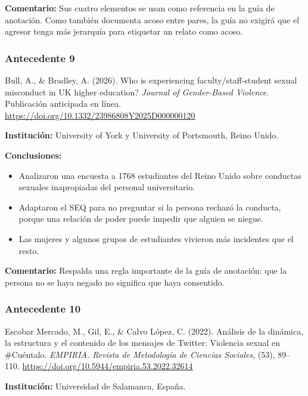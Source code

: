 \noindent\textbf{Comentario:} Sus cuatro elementos se usan como referencia en la guía de anotación. Como también documenta acoso entre pares, la guía no exigirá que el agresor tenga más jerarquía para etiquetar un relato como acoso.

\subsubsection{Antecedente 9}
\noindent Bull, A., \& Bradley, A. (2026). Who is experiencing faculty/staff-student sexual misconduct in UK higher education? \textit{Journal of Gender-Based Violence}. Publicación anticipada en línea. \url{https://doi.org/10.1332/23986808Y2025D000000120}

\noindent\textbf{Institución:} University of York y University of Portsmouth, Reino Unido.

\noindent\textbf{Conclusiones:}
\begin{itemize}
	\item Analizaron una encuesta a 1768 estudiantes del Reino Unido sobre conductas sexuales inapropiadas del personal universitario.
	\item Adaptaron el SEQ para no preguntar si la persona rechazó la conducta, porque una relación de poder puede impedir que alguien se niegue.
	\item Las mujeres y algunos grupos de estudiantes vivieron más incidentes que el resto.
\end{itemize}

\noindent\textbf{Comentario:} Respalda una regla importante de la guía de anotación: que la persona no se haya negado no significa que haya consentido.

\subsubsection{Antecedente 10}
\noindent Escobar Mercado, M., Gil, E., \& Calvo López, C. (2022). Análisis de la dinámica, la estructura y el contenido de los mensajes de Twitter: Violencia sexual en \#Cuéntalo. \textit{EMPIRIA. Revista de Metodología de Ciencias Sociales}, (53), 89--110. \url{https://doi.org/10.5944/empiria.53.2022.32614}

\noindent\textbf{Institución:} Universidad de Salamanca, España.

